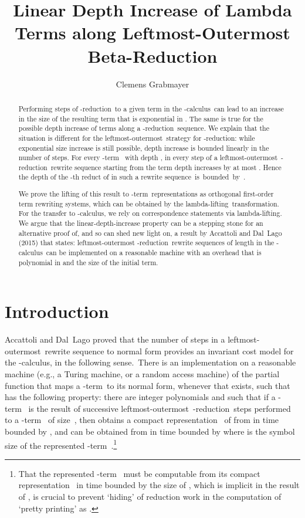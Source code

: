 \documentclass[
submission
]{dmtcs-episciences-tampered}
\author{Clemens Grabmayer\affiliationmark{1}}
\title{{Linear Depth Increase of Lambda Terms
        along Leftmost-Outermost Beta-Reduction}}
\affiliation{
Gran Sasso Science Institute, Viale F. Crispi, 7, 67100 L'Aquila AQ, Italy}
\newcommand{\nb}{\nobreakdash}
\newcommand{\lambdacalculus}{\nb-cal\-cu\-lus}
\newcommand{\lambdaterm}{\nb-term}
\newcommand{\lambdalifting}{lambda-lif\-ting}
\newcommand{\betareduction}{\nb-re\-duc\-tion}
\newcommand{\lo}{left\-most-outer\-most}
\theoremstyle{plain}
\theoremstyle{definition}
\begin{document}
\maketitle
\begin{abstract}
  Performing  steps of \betareduction\ to a given term in the \lambdacalculus\ 
  can lead to an increase in the size of the resulting term that is exponential in . 
  The same is true for the possible depth increase of terms along a \betareduction\ sequence. 
  We explain that the situation is different for the \lo\ strategy for \betareduction:
  while exponential size increase is still possible, depth increase is bounded linearly in the number of steps. 
  For every \lambdaterm~ with depth , 
  in every step of a \lo\ \betareduction\ rewrite sequence starting from  
  the term depth increases by at most .
  Hence the depth of the \nb-th reduct of  in such a rewrite sequence~is~bounded~by~.
  
  We prove the lifting of this result to \lambdaterm\ representations as orthogonal first-order term rewriting systems,
  which can be obtained by the \lambdalifting\ transformation.
  For the transfer to \lambdacalculus, we rely on correspondence statements via \lambdalifting. 
  We argue that the linear-depth-increase property can be a stepping stone for an alternative proof of, and so can shed new light on,
  a result by Accattoli and Dal~Lago (2015) that states: 
  leftmost-outermost \betareduction\ rewrite sequences of length  in the \lambdacalculus\ can be implemented on a reasonable machine with an overhead
  that is polynomial in  and the size of the initial term. 
  
\end{abstract}



\section{Introduction}
Accattoli and Dal~Lago \cite{acca:lago:2014:beta-reduction-invariant:LICS,acca:lago:2016}
proved that the number of steps in a
\lo\ rewrite sequence to normal form provides an invariant cost model for the \lambdacalculus, in the following sense.\ 
There is an implementation  on a reasonable machine (e.g., a Turing machine, or a random access machine)
of the partial function that maps a \lambdaterm\ to its normal form, whenever that exists,
such that  has the following property: 
there are integer polynomials  and 
such that if a \lambdaterm~ is the result of  successive \lo\ \betareduction\ steps performed to a \lambdaterm~ of size~,
then  obtains a compact representation~ of  from 
in time bounded by , 
and  can be obtained from  in time bounded by  where  is the symbol size of 
the represented \lambdaterm~.\footnote{That the represented \lambdaterm~ must be computable from its compact representation~
            in time bounded by the size of ,
            which is implicit in the result of \cite{acca:lago:2014:beta-reduction-invariant:LICS,acca:lago:2016},
            is crucial to prevent `hiding' of reduction work in the computation of `pretty printing'  as .} 
\end{document}
